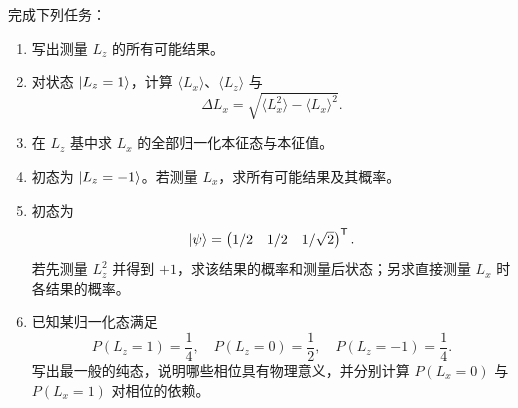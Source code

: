 完成下列任务：
\begin{enumerate}[leftmargin=*]
  \item 写出测量 $L_z$ 的所有可能结果。
  \item 对状态 $\left|L_z=1\right\rangle$，计算 $\langle L_x\rangle$、$\langle L_z\rangle$ 与
  \[
    \Delta L_x
    =\sqrt{\langle L_x^2\rangle-\langle L_x\rangle^2}.
  \]
  \item 在 $L_z$ 基中求 $L_x$ 的全部归一化本征态与本征值。
  \item 初态为 $\left|L_z=-1\right\rangle$。若测量 $L_x$，求所有可能结果及其概率。
  \item 初态为
  \[
    \left|\psi\right\rangle
    =\begin{pmatrix}1/2&1/2&1/\sqrt2\end{pmatrix}^{\mathsf T}.
  \]
  若先测量 $L_z^2$ 并得到 $+1$，求该结果的概率和测量后状态；另求直接测量 $L_x$ 时各结果的概率。
  \item 已知某归一化态满足
  \[
    P(L_z=1)=\frac14,
    \quad P(L_z=0)=\frac12,
    \quad P(L_z=-1)=\frac14.
  \]
  写出最一般的纯态，说明哪些相位具有物理意义，并分别计算 $P(L_x=0)$ 与 $P(L_x=1)$ 对相位的依赖。
\end{enumerate}

